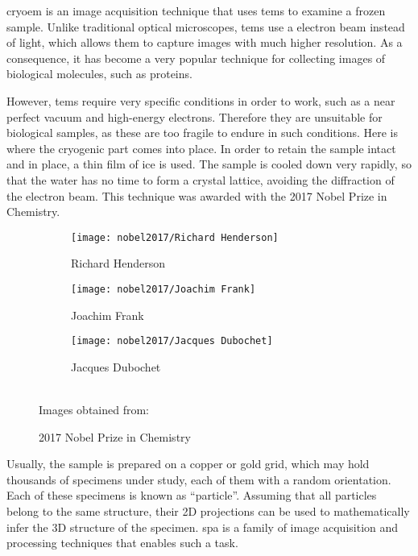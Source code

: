 \documentclass[../main.tex]{subfiles}
\begin{document}
\gls{cryoem} is an image acquisition technique that uses \glspl{tem} to examine a frozen sample. Unlike traditional optical microscopes, \glspl{tem} use a electron beam instead of light, which allows them to capture images with much higher resolution. As a consequence, it has become a very popular technique for collecting images of biological molecules, such as proteins\cite{chemistry_world_cryoem}.

However, \glspl{tem} require very specific conditions in order to work, such as a near perfect vacuum and high-energy electrons. Therefore they are unsuitable for biological samples, as these are too fragile to endure in such conditions. Here is where the cryogenic part comes into place. In order to retain the sample intact and in place, a thin film of ice is used. The sample is cooled down very rapidly, so that the water has no time to form a crystal lattice, avoiding the diffraction of the electron beam. This technique was awarded with the 2017 Nobel Prize in Chemistry\cite{chemistry_world_cryoem}.

\begin{figure}[h]
    \centering
    \begin{subfigure}[b]{0.3\textwidth}
         \centering
         \texttt{[image: nobel2017/Richard Henderson]}
         \caption{Richard Henderson}
         \label{fig:1:nobel2017:richard}
    \end{subfigure}
    \hfill
    \begin{subfigure}[b]{0.3\textwidth}
         \centering
         \texttt{[image: nobel2017/Joachim Frank]}
         \caption{Joachim Frank}
         \label{fig:1:nobel2017:joachim}
    \end{subfigure}
    \hfill
    \begin{subfigure}[b]{0.3\textwidth}
         \centering
         \texttt{[image: nobel2017/Jacques Dubochet]}
         \caption{Jacques Dubochet}
         \label{fig:1:nobel2017:jaques}
    \end{subfigure}\\
    Images obtained from: \cite{science_nobel}
    \caption{2017 Nobel Prize in Chemistry}
    \label{fig:1:nobel2017}
\end{figure}

Usually, the sample is prepared on a copper or gold grid, which may hold thousands of specimens under study, each of them with a random orientation. Each of these specimens is known as ``particle''. Assuming that all particles belong to the same structure, their 2D projections can be used to mathematically infer the 3D structure of the specimen\cite{cryoem101}. \Gls{spa} is a family of image acquisition and processing techniques that enables such a task.
\end{document}
